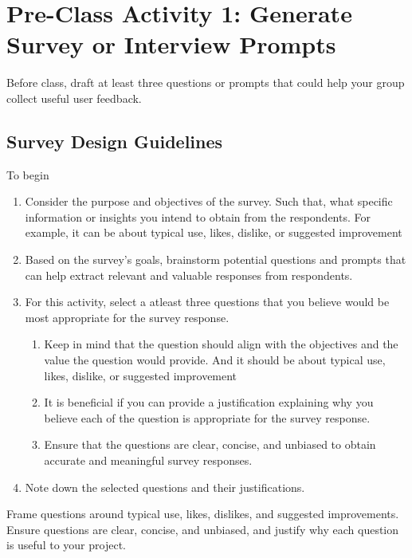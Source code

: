 \section{Pre-Class Activity 1: Generate Survey or Interview Prompts}

Before class, draft at least three questions or prompts that could help your group collect useful user feedback.

\subsection{Survey Design Guidelines}


To begin
\begin{enumerate}
    \item Consider the purpose and objectives of the survey. Such that, what specific information or insights you intend to obtain from the respondents. 
    For example, it can be about typical use, likes, dislike, or suggested improvement
    \item Based on the survey's goals, brainstorm potential questions and prompts that can help extract relevant and valuable responses from respondents.
    \item For this activity, select a atleast three questions that you believe would be most appropriate for the survey response.
    \begin{enumerate}
        \item Keep in mind that the question should align with the objectives and the value the question would provide. And it should be about typical use, likes, dislike, or suggested improvement
        \item It is beneficial if you can provide a justification explaining why you believe each of the question is appropriate for the survey response.
        \item Ensure that the questions are clear, concise, and unbiased to obtain accurate and meaningful survey responses.
    \end{enumerate}
    \item Note down the selected questions and their justifications.
\end{enumerate}

\begin{tcolorbox}[title=Hint]
Frame questions around typical use, likes, dislikes, and suggested improvements. Ensure questions are clear, concise, and unbiased, and justify why each question is useful to your project.
\end{tcolorbox}

